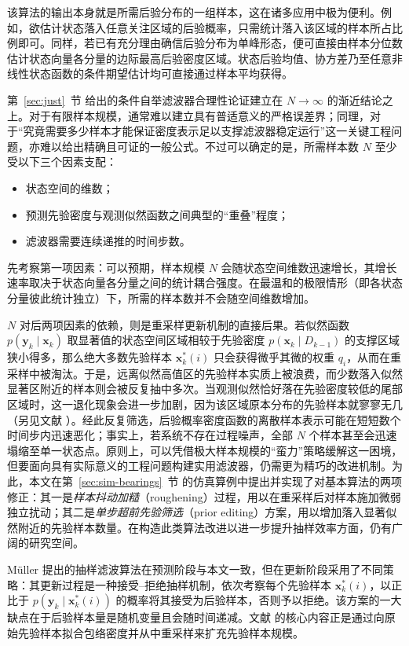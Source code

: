 该算法的输出本身就是所需后验分布的一组样本，这在诸多应用中极为便利。例如，欲估计状态落入任意关注区域的后验概率，只需统计落入该区域的样本所占比例即可。同样，若已有充分理由确信后验分布为单峰形态，便可直接由样本分位数估计状态向量各分量的边际最高后验密度区域。状态后验均值、协方差乃至任意非线性状态函数的条件期望估计均可直接通过样本平均获得。

第~\ref{sec:just}~节 给出的条件自举滤波器合理性论证建立在 $N \to \infty$ 的渐近结论之上。对于有限样本规模，通常难以建立具有普适意义的严格误差界；同理，对于“究竟需要多少样本才能保证密度表示足以支撑滤波器稳定运行”这一关键工程问题，亦难以给出精确且可证的一般公式。不过可以确定的是，所需样本数 $N$ 至少受以下三个因素支配：

\begin{itemize}
\item 状态空间的维数；
\item 预测先验密度与观测似然函数之间典型的“重叠”程度；
\item 滤波器需要连续递推的时间步数。
\end{itemize}

先考察第一项因素：可以预期，样本规模 $N$ 会随状态空间维数迅速增长，其增长速率取决于状态向量各分量之间的统计耦合强度。在最温和的极限情形（即各状态分量彼此统计独立）下，所需的样本数并不会随空间维数增加。

$N$ 对后两项因素的依赖，则是重采样更新机制的直接后果。若似然函数 $p(\bm{y}_k \mid \bm{x}_k)$ 取显著值的状态空间区域相较于先验密度 $p(\bm{x}_k \mid D_{k-1})$ 的支撑区域狭小得多，那么绝大多数先验样本 $\bm{x}_k^*(i)$ 只会获得微乎其微的权重 $q_i$，从而在重采样中被淘汰。于是，远离似然高值区的先验样本实质上被浪费，而少数落入似然显著区附近的样本则会被反复抽中多次。当观测似然恰好落在先验密度较低的尾部区域时，这一退化现象会进一步加剧，因为该区域原本分布的先验样本就寥寥无几（另见文献 \cite{r14}）。经此反复筛选，后验概率密度函数的离散样本表示可能在短短数个时间步内迅速恶化；事实上，若系统不存在过程噪声，全部 $N$ 个样本甚至会迅速塌缩至单一状态点。原则上，可以凭借极大样本规模的“蛮力”策略缓解这一困境，但要面向具有实际意义的工程问题构建实用滤波器，仍需更为精巧的改进机制。为此，本文在第~\ref{sec:sim-bearings}~节 的仿真算例中提出并实现了对基本算法的两项修正：其一是\emph{样本抖动加糙}（roughening）过程，用以在重采样后对样本施加微弱独立扰动；其二是\emph{单步超前先验筛选}（prior editing）方案，用以增加落入显著似然附近的先验样本数量。在构造此类算法改进以进一步提升抽样效率方面，仍有广阔的研究空间。

Müller \cite{r12} 提出的抽样滤波算法在预测阶段与本文一致，但在更新阶段采用了不同策略：其更新过程是一种接受–拒绝抽样机制，依次考察每个先验样本 $\bm{x}_k^*(i)$，以正比于 $p(\bm{y}_k \mid \bm{x}_k^*(i))$ 的概率将其接受为后验样本，否则予以拒绝。该方案的一大缺点在于后验样本量是随机变量且会随时间递减。文献 \cite{r12} 的核心内容正是通过向原始先验样本拟合包络密度并从中重采样来扩充先验样本规模。
